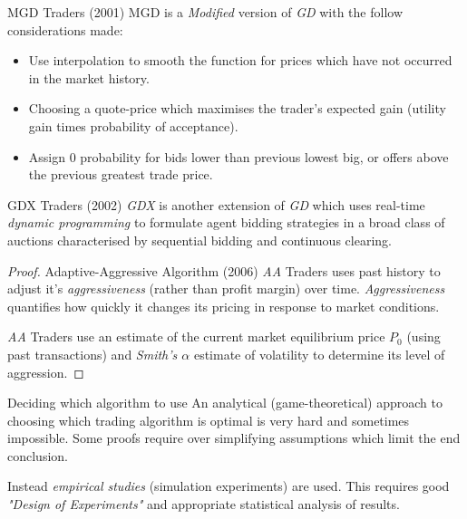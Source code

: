 \documentclass[11pt,a4paper]{article}
\begin{document}
\begin{proposition}{MGD Traders (2001)}
  MGD is a \textit{Modified} version of \textit{GD} with the follow considerations made:
  \begin{itemize}
    \item Use interpolation to smooth the function for prices which have not occurred in the market history.
    \item Choosing a quote-price which maximises the trader's expected gain (utility gain times probability of acceptance).
    \item Assign 0 probability for bids lower than previous lowest big, or offers above the previous greatest trade price.
  \end{itemize}
\end{proposition}

\begin{proposition}{GDX Traders (2002)}
  \textit{GDX} is another extension of \textit{GD} which uses real-time \textit{dynamic programming} to formulate agent bidding strategies in a broad class of auctions characterised by sequential bidding and continuous clearing.
\end{proposition}

\begin{proof}{Adaptive-Aggressive Algorithm (2006)}
  \textit{AA} Traders uses past history to adjust it's \textit{aggressiveness} (rather than profit margin) over time. \textit{Aggressiveness} quantifies how quickly it changes its pricing in response to market conditions.
  \par \textit{AA} Traders use an estimate of the current market equilibrium price $P_0$ (using past transactions) and \textit{Smith's $\alpha$} estimate of volatility to determine its level of aggression.
\end{proof}

\begin{proposition}{Deciding which algorithm to use}
  An analytical (game-theoretical) approach to choosing which trading algorithm is optimal is very hard and sometimes impossible. Some proofs require over simplifying assumptions which limit the end conclusion.
  \par Instead \textit{empirical studies} (simulation experiments) are used. This requires good \textit{"Design of Experiments"} and appropriate statistical analysis of results.
\end{proposition}
\end{document}
